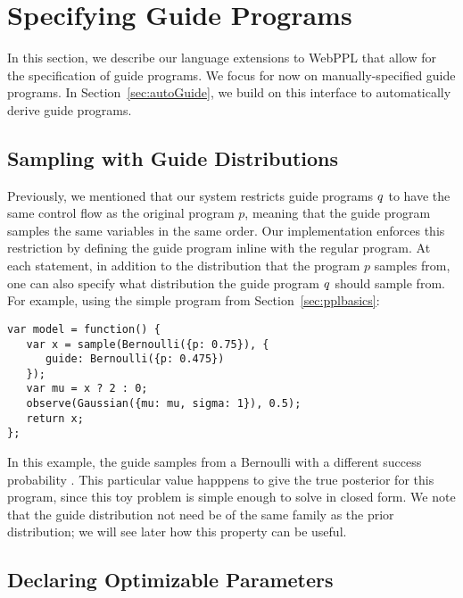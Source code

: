 \section{Specifying Guide Programs}
\label{sec:guideSpec}

In this section, we describe our language extensions to WebPPL that allow for the specification of guide programs.
We focus for now on manually-specified guide programs. In Section~\ref{sec:autoGuide}, we build on this interface to automatically derive guide programs.

\subsection{Sampling with Guide Distributions}

Previously, we mentioned that our system restricts guide programs $q$ to have the same control flow as the original program $p$, meaning that the guide program samples the same variables in the same order.
Our implementation enforces this restriction by defining the guide program inline with the regular program.
At each  statement, in addition to the distribution that the program $p$ samples from, one can also specify what distribution the guide program $q$ should sample from. For example, using the simple program from Section~\ref{sec:pplbasics}:
\begin{lstlisting}
var model = function() {
   var x = sample(Bernoulli({p: 0.75}), {
      guide: Bernoulli({p: 0.475})
   });
   var mu = x ? 2 : 0;
   observe(Gaussian({mu: mu, sigma: 1}), 0.5);
   return x;
};
\end{lstlisting}
In this example, the guide samples from a Bernoulli with a different success probability . This particular value happpens to give the true posterior for this program, since this toy problem is simple enough to solve in closed form.
We note that the guide distribution not need be of the same family as the prior distribution; we will see later how this property can be useful.

\subsection{Declaring Optimizable Parameters}

